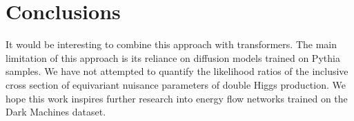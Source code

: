 \section{Conclusions}\label{sec:conclusions}

It would be interesting to combine this approach with transformers. The
main limitation of this approach is its reliance on diffusion models
trained on Pythia samples. We have not attempted to quantify the
likelihood ratios of the inclusive cross section of equivariant nuisance
parameters of double Higgs production. We hope this work inspires
further research into energy flow networks trained on the Dark Machines
dataset.

